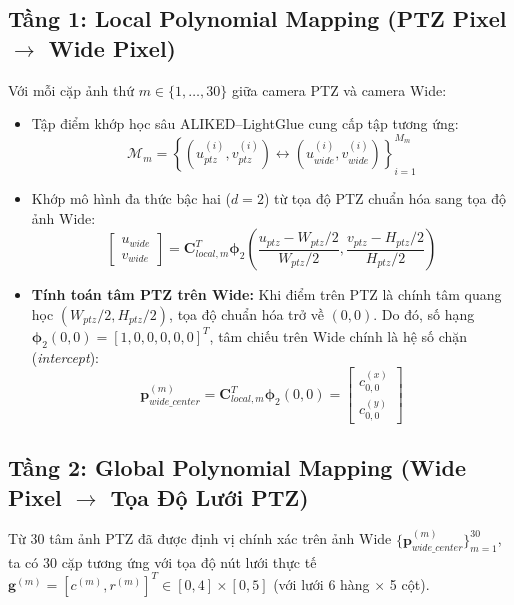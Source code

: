 \documentclass[11pt,a4paper]{article}
\begin{document}
\subsection{Tầng 1: Local Polynomial Mapping (PTZ Pixel $\to$ Wide Pixel)}
Với mỗi cặp ảnh thứ $m \in \{1, \dots, 30\}$ giữa camera PTZ và camera Wide:
\begin{itemize}
    \item Tập điểm khớp học sâu ALIKED--LightGlue cung cấp tập tương ứng:
    \begin{equation}
        \mathcal{M}_m = \left\{ (u_{ptz}^{(i)}, v_{ptz}^{(i)}) \longleftrightarrow (u_{wide}^{(i)}, v_{wide}^{(i)}) \right\}_{i=1}^{M_m}
    \end{equation}
    \item Khớp mô hình đa thức bậc hai ($d=2$) từ tọa độ PTZ chuẩn hóa sang tọa độ ảnh Wide:
    \begin{equation}
        \begin{bmatrix} u_{wide} \\ v_{wide} \end{bmatrix} = \mathbf{C}_{local, m}^T \bm{\phi}_2\left(\frac{u_{ptz} - W_{ptz}/2}{W_{ptz}/2}, \frac{v_{ptz} - H_{ptz}/2}{H_{ptz}/2}\right)
    \end{equation}
    \item \textbf{Tính toán tâm PTZ trên Wide:} Khi điểm trên PTZ là chính tâm quang học $(W_{ptz}/2, H_{ptz}/2)$, tọa độ chuẩn hóa trở về $(0, 0)$. Do đó, số hạng $\bm{\phi}_2(0, 0) = [1, 0, 0, 0, 0, 0]^T$, tâm chiếu trên Wide chính là hệ số chặn (\textit{intercept}):
    \begin{equation}
        \mathbf{p}_{wide\_center}^{(m)} = \mathbf{C}_{local, m}^T \bm{\phi}_2(0, 0) = \begin{bmatrix} c_{0, 0}^{(x)} \\ c_{0, 0}^{(y)} \end{bmatrix}
    \end{equation}
\end{itemize}

\subsection{Tầng 2: Global Polynomial Mapping (Wide Pixel $\to$ Tọa Độ Lưới PTZ)}
Từ 30 tâm ảnh PTZ đã được định vị chính xác trên ảnh Wide $\{\mathbf{p}_{wide\_center}^{(m)}\}_{m=1}^{30}$, ta có 30 cặp tương ứng với tọa độ nút lưới thực tế $\mathbf{g}^{(m)} = [c^{(m)}, r^{(m)}]^T \in [0, 4] \times [0, 5]$ (với lưới 6 hàng $\times$ 5 cột).
\end{document}
